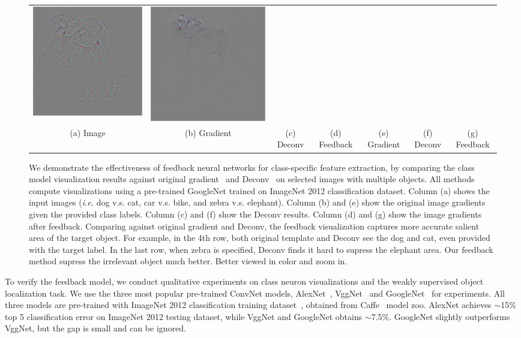 \begin{figure}
\begin{center}
\begin{tabular}{ccccccc}
\includegraphics[width=0.14\linewidth,height=0.115\linewidth]{figs/examples/googlenet/deconv/zeb-ele2_diff_387} &
\includegraphics[width=0.14\linewidth,height=0.115\linewidth]{figs/examples/googlenet/soft/zeb-ele2_diff_387} \\
{\small (a) Image} &
{\small (b) Gradient} &
{\small (c) Deconv} &
{\small (d) Feedback} &
{\small (e) Gradient} &
{\small (f) Deconv} &
{\small (g) Feedback} \\
\end{tabular}
\caption{We demonstrate the effectiveness of feedback neural networks for class-specific feature extraction, by comparing the class model visualization results against original gradient~\cite{simonyan2013deep} and Deconv~\cite{zeiler2014visualizing} on selected images with multiple objects. All methods compute visualizations using a pre-trained GoogleNet trained on ImageNet 2012 classification dataset. Column (a) shows the input images (\emph{i.e.} dog v.s. cat, car v.s. bike, and zebra v.s. elephant). Column (b) and (e) show the original image gradients given the provided class labels. Column (c) and (f) show the Deconv results. Column (d) and (g) show the image gradients after feedback. Comparing against original gradient and Deconv, the feedback visualization captures more accurate salient area of the target object. For example, in the 4th row, both original template and Deconv see the dog and cat, even provided with the target label. In the last row, when zebra is specified, Deconv finds it hard to supress the elephant area. Our feedback method supress the irrelevant object much better. Better viewed in color and zoom in.}
\label{fig:examples}
\end{center}
\end{figure}

To verify the feedback model, we conduct qualitative experiments on class neuron visualizations and the weakly supervised object localization task. We use the three most popular pre-trained ConvNet models, AlexNet~\cite{Krizhevsky2012ImageNet}, VggNet~\cite{simonyan2013deep} and GoogleNet~\cite{Szegedy2014Going} for experiments. All three models are pre-trained with ImageNet 2012 classification training dataset~\cite{deng2009imagenet}, obtained from Caffe~\cite{jia2014caffe} model zoo. AlexNet achieves $\sim$15\% top 5 classification error on ImageNet 2012 testing dataset, while VggNet and GoogleNet obtains $\sim$7.5\%. GoogleNet slightly outperforms VggNet, but the gap is small and can be ignored.

